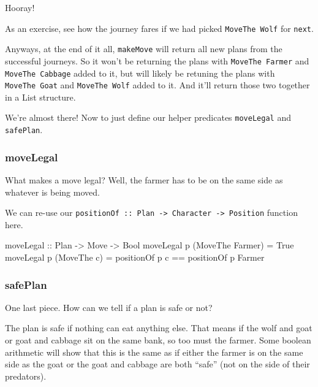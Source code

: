 \documentclass[]{article}
\newenvironment{Shaded}{}{}
\newcommand{\DataTypeTok}[1]{\textcolor[rgb]{0.56,0.13,0.00}{{#1}}}
\newcommand{\OtherTok}[1]{\textcolor[rgb]{0.00,0.44,0.13}{{#1}}}
\newcommand{\FunctionTok}[1]{\textcolor[rgb]{0.02,0.16,0.49}{{#1}}}
\newcommand{\NormalTok}[1]{{#1}}
\begin{document}
Hooray!

As an exercise, see how the journey fares if we had picked
\texttt{MoveThe\ Wolf} for \texttt{next}.

Anyways, at the end of it all, \texttt{makeMove} will return all new plans from
the successful journeys. So it won't be returning the plans with
\texttt{MoveThe\ Farmer} and \texttt{MoveThe\ Cabbage} added to it, but will
likely be retuning the plans with \texttt{MoveThe\ Goat} and
\texttt{MoveThe\ Wolf} added to it. And it'll return those two together in a
List structure.

We're almost there! Now to just define our helper predicates \texttt{moveLegal}
and \texttt{safePlan}.

\subsubsection{moveLegal}\label{movelegal}

What makes a move legal? Well, the farmer has to be on the same side as whatever
is being moved.

We can re-use our
\texttt{positionOf\ ::\ Plan\ -\textgreater{}\ Character\ -\textgreater{}\ Position}
function here.

\begin{Shaded}
\begin{Highlighting}[]
\OtherTok{moveLegal ::} \DataTypeTok{Plan} \OtherTok{->} \DataTypeTok{Move} \OtherTok{->} \DataTypeTok{Bool}
\NormalTok{moveLegal p (}\DataTypeTok{MoveThe} \DataTypeTok{Farmer}\NormalTok{)  }\FunctionTok{=} \DataTypeTok{True}
\NormalTok{moveLegal p (}\DataTypeTok{MoveThe} \NormalTok{c)       }\FunctionTok{=} \NormalTok{positionOf p c }\FunctionTok{==} \NormalTok{positionOf p }\DataTypeTok{Farmer}
\end{Highlighting}
\end{Shaded}

\subsubsection{safePlan}\label{safeplan}

One last piece. How can we tell if a plan is safe or not?

The plan is safe if nothing can eat anything else. That means if the wolf and
goat or goat and cabbage sit on the same bank, so too must the farmer. Some
boolean arithmetic will show that this is the same as if either the farmer is on
the same side as the goat or the goat and cabbage are both ``safe'' (not on the
side of their predators).
\end{document}
